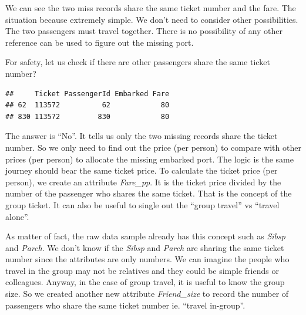 \documentclass[
]{book}
\newenvironment{Shaded}{\begin{snugshade}}{\end{snugshade}}
\newcommand{\CommentTok}[1]{\textcolor[rgb]{0.56,0.35,0.01}{\textit{#1}}}
\newcommand{\DataTypeTok}[1]{\textcolor[rgb]{0.13,0.29,0.53}{#1}}
\newcommand{\KeywordTok}[1]{\textcolor[rgb]{0.13,0.29,0.53}{\textbf{#1}}}
\newcommand{\NormalTok}[1]{#1}
\newcommand{\OperatorTok}[1]{\textcolor[rgb]{0.81,0.36,0.00}{\textbf{#1}}}
\newcommand{\StringTok}[1]{\textcolor[rgb]{0.31,0.60,0.02}{#1}}
\begin{document}
We can see the two miss records share the same ticket number and the fare. The situation because extremely simple. We don't need to consider other possibilities. The two passengers must travel together. There is no possibility of any other reference can be used to figure out the missing port.

For safety, let us check if there are other passengers share the same ticket number?

\begin{Shaded}
\end{Shaded}

\begin{verbatim}
##     Ticket PassengerId Embarked Fare
## 62  113572          62            80
## 830 113572         830            80
\end{verbatim}

The answer is ``No''. It tells us only the two missing records share the ticket number. So we only need to find out the price (per person) to compare with other prices (per person) to allocate the missing embarked port. The logic is the same journey should bear the same ticket price. To calculate the ticket price (per person), we create an attribute \emph{Fare\_pp}. It is the ticket price divided by the number of the passenger who shares the same ticket. That is the concept of the group ticket. It can also be useful to single out the ``group travel'' vs ``travel alone''.

As matter of fact, the raw data sample already has this concept such as \emph{Sibsp} and \emph{Parch}. We don't know if the \emph{Sibsp} and \emph{Parch} are sharing the same ticket number since the attributes are only numbers. We can imagine the people who travel in the group may not be relatives and they could be simple friends or colleagues. Anyway, in the case of group travel, it is useful to know the group size. So we created another new attribute \emph{Friend\_size} to record the number of passengers who share the same ticket number ie. ``travel in-group''.

\begin{Shaded}
\end{Shaded}
\end{document}
